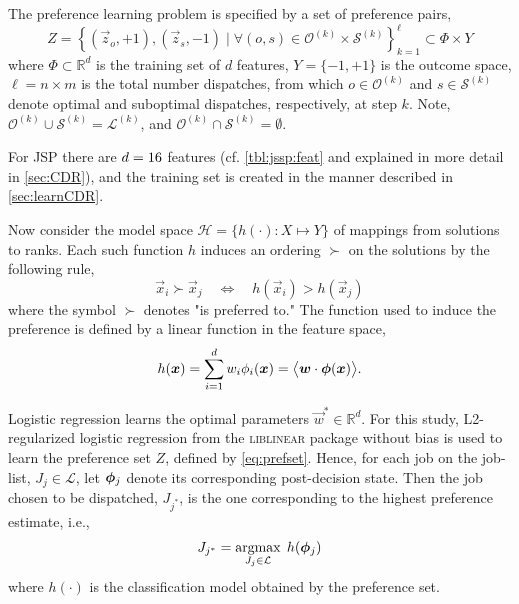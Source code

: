 \documentclass[smallextended]{svjour3}
\begin{document}
The preference learning problem is specified by a set of preference pairs,
\begin{equation}
	Z = 
	\left\{\left(\vec{z}_o,+1\right),\left(\vec{z}_s,-1\right)
	\;|\;\forall (o,s) \in \mathcal{O}^{(k)} \times \mathcal{S}^{(k)}
	\right\}_{k=1}^{\ell} \subset \Phi\times Y \label{eq:prefset}
\end{equation}
where $\Phi\subset \mathbb{R}^d$ is the training set of $d$ features,  
$Y=\{-1,+1\}$ is the outcome space, $\ell=n\times m$ is the total number 
dispatches, from which $o\in\mathcal{O}^{(k)}$ and $s\in \mathcal{S}^{(k)}$ 
denote optimal and suboptimal dispatches, respectively, at step $k$. 
Note, $\mathcal{O}^{(k)}\cup\mathcal{S}^{(k)}=\mathcal{L}^{(k)}$, and 
$\mathcal{O}^{(k)}\cap\mathcal{S}^{(k)}=\emptyset$. 

For JSP there are $d=16$ features (cf. \cref{tbl:jssp:feat} and 
explained in more detail in \cref{sec:CDR}), and the training set is created in 
the manner described in \cref{sec:learnCDR}.

Now consider the model space $\mathcal{H} = \{h(\cdot) : X \mapsto Y\}$ of 
mappings from solutions to ranks. Each such function $h$ induces an ordering 
$\succ$ on the solutions  by the following rule,
\begin{equation}\label{eq:linear}
	\vec{x}_i \succ \vec{x}_j \quad \Leftrightarrow \quad h(\vec{x}_i) > 
	h(\vec{x}_j)
\end{equation}
where the symbol $\succ$ denotes "is preferred to."  The function used to 
induce the preference is defined by a linear function in the feature space,
\begin{equation}\label{eq:jssp:linweights}
	h(\vec{x})=\sum_{i=1}^d w_i\phi_i(\vec{x})=\inner{\vec{w}}{\vphi(\vec{x})}.
\end{equation}

Logistic regression learns the optimal parameters $\vec{w}^*\in\mathbb{R}^d$. 
For this study, L2-regularized logistic regression from the \textsc{liblinear} 
package \cite{liblinear} without bias is used to learn the preference set 
$Z$, 
defined by \cref{eq:prefset}.
Hence, for each job on the job-list, $J_j\in\mathcal{L}$, let $\bm{\phi}_j$ denote 
its corresponding  post-decision state. Then the job chosen to be dispatched, 
$J_{j^*}$, is the one corresponding to the highest preference estimate, i.e.,
\begin{equation}\label{eq:lin}
	J_{j^*}=\mathop{\rm argmax}_{J_j\in \mathcal{L}}\; h(\bm{\phi}_j)
\end{equation}
where $h(\cdot)$ is the classification model obtained by the preference set.
\end{document}
